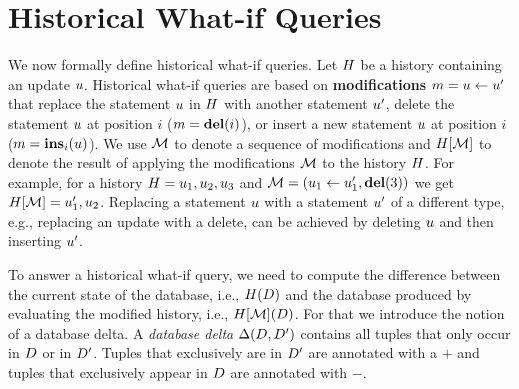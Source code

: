 \section{Historical What-if Queries}
\label{sec:whif-def}
We now formally define historical what-if queries. %
Let $H$ be a history containing an update $u$.
Historical what-if queries are based on \textbf{modifications} $m = u \gets u'$ that replace the statement $u$ in $H$ with another statement $u'$, delete the statement $u$ at position $i$ ($m = \mathbf{del}(i)$), or insert a new statement $u$ at position $i$ ($m = \mathbf{ins}_{i}(u)$).
We use $\mathcal{M}$ to denote a sequence of modifications and $H[\mathcal{M}]$ to denote the result of applying the modifications
$\mathcal{M}$ to the history $H$. For example, for a history $H = u_1, u_2, u_3$ and $\mathcal{M} = (u_1 \gets u_1', \mathbf{del}(3))$ we get $H[\mathcal{M}] = u_1', u_2$. %
Replacing a statement $u$ with a statement $u'$ of a different type, e.g., replacing an update with a delete, can be achieved by deleting $u$ and then inserting $u'$.

To answer a historical what-if query, we need to compute the difference between the current state of the database, i.e., $H(D)$ and the database produced by evaluating the modified history, i.e., $H[\mathcal{M}](D)$.
For that we introduce the notion of a database delta.
A \emph{database delta} $\Delta(D,D')$ contains all tuples that only occur in $D$ or in $D'$. Tuples that exclusively are in $D'$ are annotated with a $+$ and tuples that exclusively appear in $D$ are annotated with $-$.  %

